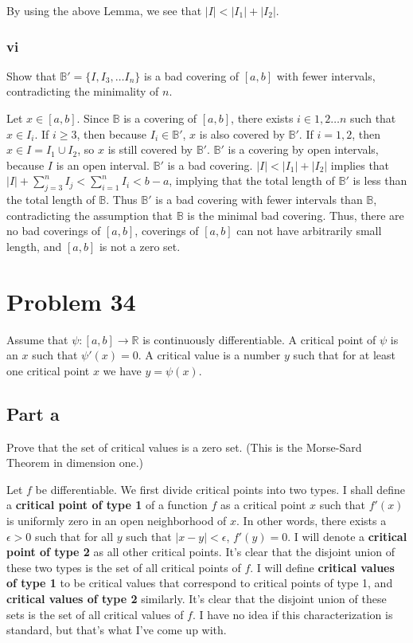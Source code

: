 \documentclass{article}
\newcommand{\R}{\mathbb{R}}
\newcommand{\B}{\mathbb{B}}
\begin{document}
By using the above Lemma, we see that $|I| < |I_1| + |I_2|$.

\subsubsection*{vi}

Show that $\B' = \{I, I_3, \dots I_n\}$ is a bad covering of $[a, b]$ with fewer intervals, contradicting the minimality of $n$.

Let $x \in [a, b]$. Since $\B$ is a covering of $[a, b]$, there exists $i \in 1, 2 \dots n$ such that $x \in I_i$. If $i \geq 3$, then because $I_i \in \B'$, $x$ is also covered by $\B'$. If $i = 1, 2$, then $x \in I = I_1 \cup I_2$, so $x$ is still covered by $\B'$. $\B'$ is a covering by open intervals, because $I$ is an open interval. $\B'$ is a bad covering. $|I| < |I_1| + |I_2|$ implies that $|I| + \sum_{j=3}^n I_j < \sum_{i=1}^n I_i < b-a$, implying that the total length of $\B'$ is less than the total length of $\B$. Thus $\B'$ is a bad covering with fewer intervals than $\B$, contradicting the assumption that $\B$ is the minimal bad covering. Thus, there are no bad coverings of $[a, b]$, coverings of $[a, b]$ can not have arbitrarily small length, and $[a, b]$ is not a zero set.

\section*{Problem 34}

Assume that $\psi: [a, b] \rightarrow \R$ is continuously differentiable. A critical point of $\psi$ is an $x$ such that $\psi'(x) = 0$. A critical value is a number $y$ such that for at least one critical point $x$ we have $y = \psi(x)$.

\subsection*{Part a}

Prove that the set of critical values is a zero set. (This is the Morse-Sard Theorem in dimension one.)

Let $f$ be differentiable. We first divide critical points into two types. I shall define a \textbf{critical point of type 1} of a function $f$ as a critical point $x$ such that $f'(x)$ is uniformly zero in an open neighborhood of $x$. In other words, there exists a $\epsilon > 0$ such that for all $y$ such that $|x-y| < \epsilon$, $f'(y) = 0$. I will denote a \textbf{critical point of type 2} as all other critical points. It's clear that the disjoint union of these two types is the set of all critical points of $f$. I will define \textbf{critical values of type 1} to be critical values that correspond to critical points of type 1, and \textbf{critical values of type 2} similarly. It's clear that the disjoint union of these sets is the set of all critical values of $f$. I have no idea if this characterization is standard, but that's what I've come up with.
\end{document}
